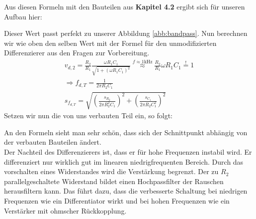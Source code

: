 Aus diesen Formeln mit den Bauteilen aus \textbf{Kapitel 4.2} ergibt sich für unseren Aufbau hier:
\begin{center}
\end{center}
Dieser Wert passt perfekt zu unserer Abbildung \ref{abb:bandpass}.
Nun berechnen wir wie oben den selben Wert mit der Formel für den unmodifizierten Differenzierer aus den Fragen zur Vorbereitung.
\begin{gather}
    v_{d,2} = \frac{R_2}{R_1} \frac{\omega R_1C_1}{\sqrt{1 + (\omega R_1C_1)^2}} \overset{f \approx 1 \text{kHz}}{\approx} \frac{R_2}{R_1} \omega R_1C_1  \overset{!}{=} 1\\
    \Rightarrow f_{d,T} = \frac{1}{2 \pi R_2 C_1}\\
    s_{f_{d,T}} = \sqrt{(\frac{s_{R_2}}{2 \pi R_{2}^2 C_1})^2+ (\frac{s_{C_1}}{2 \pi R_{2} C_{1}^2})^2}
\end{gather}
Setzen wir nun die von uns verbauten Teil ein, so folgt:
\begin{center}
\end{center}
An den Formeln sieht man sehr schön, dass sich der Schnittpunkt abhängig von der verbauten 
Bauteilen ändert.\\
Der Nachteil des Differenzierers ist, dass er für hohe Frequenzen instabil wird. Er differenziert nur 
wirklich gut im linearen niedrigfrequenten Bereich. Durch das vorschalten eines Widerstandes wird die Verstärkung begrenzt. 
Der zu $R_2$ parallelgeschaltete Widerstand bildet einen Hochpassfilter der Rauschen herausfiltern kann. 
Das führt dazu, dass die verbesserte Schaltung bei niedrigen Frequenzen wie ein Differentiator wirkt und bei hohen 
Frequenzen wie ein Verstärker mit ohmscher Rückkopplung.\footnotemark
{}
